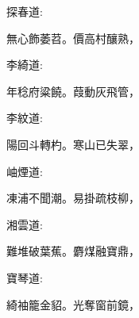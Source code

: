 \begin{parag}
    探春道:
\end{parag}


\begin{poem}
    \begin{pl} 無心飾萎苕。價高村釀熟，\end{pl}
\end{poem}


\begin{parag}
    李綺道:
\end{parag}


\begin{poem}
    \begin{pl} 年稔府粱饒。葭動灰飛管，\end{pl}
\end{poem}


\begin{parag}
    李紋道:
\end{parag}


\begin{poem}
    \begin{pl} 陽回斗轉杓。寒山已失翠，\end{pl}
\end{poem}


\begin{parag}
    岫煙道:
\end{parag}


\begin{poem}
    \begin{pl} 凍浦不聞潮。易掛疏枝柳，\end{pl}
\end{poem}


\begin{parag}
    湘雲道:
\end{parag}


\begin{poem}
    \begin{pl} 難堆破葉蕉。麝煤融寶鼎，\end{pl}
\end{poem}


\begin{parag}
    寶琴道:
\end{parag}


\begin{poem}
    \begin{pl} 綺袖籠金貂。光奪窗前鏡，\end{pl}
\end{poem}


